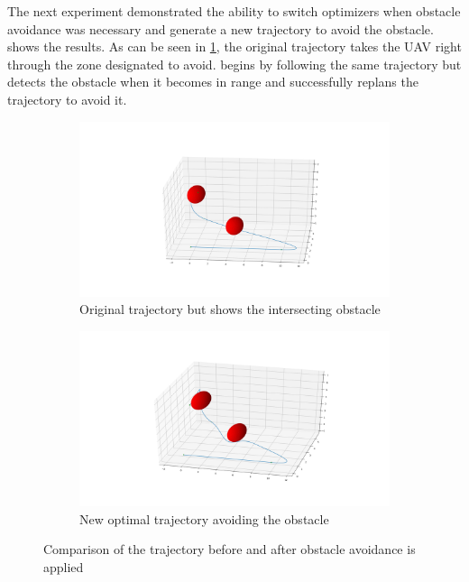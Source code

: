 \documentclass[letterpaper,conference, 10pt]{ieeeconf}
\begin{document}
The next experiment demonstrated the ability to switch optimizers when obstacle avoidance was necessary and generate a new trajectory to avoid the obstacle.  shows the results. As can be seen in \cref{fig:diff_flat}, the original trajectory takes the UAV right through the zone designated to avoid.  begins by following the same trajectory but detects the obstacle when it becomes in range and successfully replans the trajectory to avoid it.

\begin{figure}[bth]
    \begin{subfigure}{0.5\textwidth}
          \centering
          \includegraphics[width=\linewidth]{diff_flat.png}  
          \caption{Original trajectory but shows the intersecting obstacle}
          \label{fig:diff_flat}
    \end{subfigure}
    \begin{subfigure}{0.5\textwidth}
          \centering
          \includegraphics[width=\linewidth]{diff_flat_obst.png}  
          \caption{New optimal trajectory avoiding the obstacle}
          \label{fig:diff_flat_obst}
    \end{subfigure}
    \caption{Comparison of the trajectory before and after obstacle avoidance is applied}
    \label{fig:obst_avoid}
\end{figure}
\end{document}

